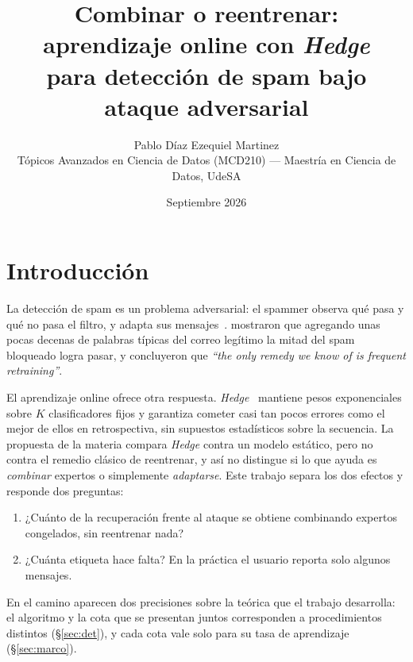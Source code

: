\documentclass[10pt,twocolumn,a4paper]{article}
\title{\Large Combinar o reentrenar: aprendizaje online con \emph{Hedge}\\
para detección de spam bajo ataque adversarial}
\author{Pablo Díaz \qquad Ezequiel Martinez\\
\small Tópicos Avanzados en Ciencia de Datos (MCD210) --- Maestría en Ciencia de Datos, UdeSA}
\date{Septiembre 2026}
\begin{document}

\section{Introducción}

La detección de spam es un problema adversarial: el spammer observa qué pasa y qué no pasa el
filtro, y adapta sus mensajes~\cite{fraiman2026clase2}. \citet{lowd2005goodword} mostraron que
agregando unas pocas decenas de palabras típicas del correo legítimo la mitad del spam bloqueado
logra pasar, y concluyeron que \emph{``the only remedy we know of is frequent retraining''}.

El aprendizaje online ofrece otra respuesta. \emph{Hedge}~\cite{freund1997decision} mantiene pesos
exponenciales sobre $K$ clasificadores fijos y garantiza cometer casi tan pocos errores como el
mejor de ellos en retrospectiva, sin supuestos estadísticos sobre la secuencia. La propuesta de la
materia compara \emph{Hedge} contra un modelo estático, pero no contra el remedio clásico de
reentrenar, y así no distingue si lo que ayuda es \emph{combinar} expertos o simplemente
\emph{adaptarse}. Este trabajo separa los dos efectos y responde dos preguntas:
\begin{enumerate}
\item ¿Cuánto de la recuperación frente al ataque se obtiene combinando expertos congelados, sin
reentrenar nada?
\item ¿Cuánta etiqueta hace falta? En la práctica el usuario reporta solo algunos mensajes.
\end{enumerate}
En el camino aparecen dos precisiones sobre la teórica que el trabajo desarrolla: el algoritmo y la
cota que se presentan juntos corresponden a procedimientos distintos (\S\ref{sec:det}), y cada cota
vale solo para su tasa de aprendizaje (\S\ref{sec:marco}).
\end{document}
